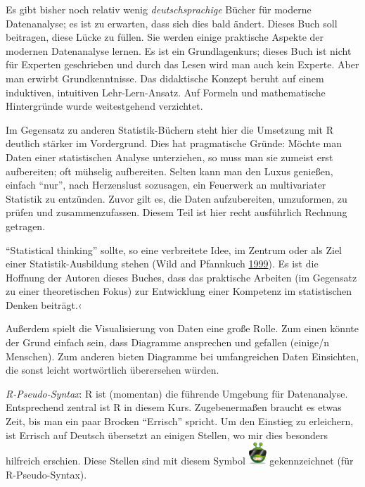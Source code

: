 \documentclass[12pt,]{book}
\begin{document}
Es gibt bisher noch relativ wenig \emph{deutschsprachige} Bücher für
moderne Datenanalyse; es ist zu erwarten, dass sich dies bald ändert.
Dieses Buch soll beitragen, diese Lücke zu füllen. Sie werden einige
praktische Aspekte der modernen Datenanalyse lernen. Es ist ein
Grundlagenkurs; dieses Buch ist nicht für Experten geschrieben und durch
das Lesen wird man auch kein Experte. Aber man erwirbt Grundkenntnisse.
Das didaktische Konzept beruht auf einem induktiven, intuitiven
Lehr-Lern-Ansatz. Auf Formeln und mathematische Hintergründe wurde
weitestgehend verzichtet.

Im Gegensatz zu anderen Statistik-Büchern steht hier die Umsetzung mit R
deutlich stärker im Vordergrund. Dies hat pragmatische Gründe: Möchte
man Daten einer statistischen Analyse unterziehen, so muss man sie
zumeist erst aufbereiten; oft mühselig aufbereiten. Selten kann man den
Luxus genießen, einfach ``nur'', nach Herzenslust sozusagen, ein
Feuerwerk an multivariater Statistik zu entzünden. Zuvor gilt es, die
Daten aufzubereiten, umzuformen, zu prüfen und zusammenzufassen. Diesem
Teil ist hier recht ausführlich Rechnung getragen.

``Statistical thinking'' sollte, so eine verbreitete Idee, im Zentrum
oder als Ziel einer Statistik-Ausbildung stehen (Wild and Pfannkuch
\protect\hyperlink{ref-wild1999statistical}{1999}). Es ist die Hoffnung
der Autoren dieses Buches, dass das praktische Arbeiten (im Gegensatz zu
einer theoretischen Fokus) zur Entwicklung einer Kompetenz im
statistischen Denken beiträgt.‹

Außerdem spielt die Visualisierung von Daten eine große Rolle. Zum einen
könnte der Grund einfach sein, dass Diagramme ansprechen und gefallen
(einige/n Menschen). Zum anderen bieten Diagramme bei umfangreichen
Daten Einsichten, die sonst leicht wortwörtlich überersehen würden.

\emph{R-Pseudo-Syntax}: R ist (momentan) die führende Umgebung für
Datenanalyse. Entsprechend zentral ist R in diesem Kurs. Zugebenermaßen
braucht es etwas Zeit, bis man ein paar Brocken ``Errisch'' spricht. Um
den Einstieg zu erleichern, ist Errisch auf Deutsch übersetzt an einigen
Stellen, wo mir dies besonders hilfreich erschien. Diese Stellen sind
mit diesem Symbol
\includegraphics[width=0.05000\textwidth]{images/pseudocode.png}
gekennzeichnet (für R-Pseudo-Syntax).
\end{document}
